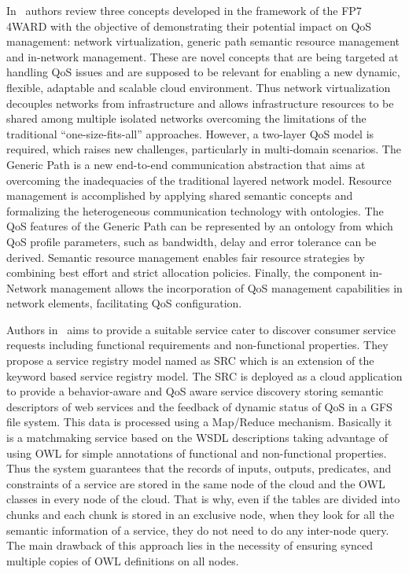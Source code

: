 In~\cite{5682131} authors review three concepts developed in the framework of 
the FP7 4WARD with the objective of demonstrating their potential impact on QoS 
management: network virtualization, generic path semantic resource management 
and in-network management. These are novel concepts that are being targeted at 
handling QoS issues and are supposed to be relevant for enabling a new dynamic, 
flexible, adaptable and scalable cloud environment. Thus network virtualization 
decouples networks from infrastructure and allows infrastructure resources to be 
shared among multiple isolated networks overcoming the limitations of the 
traditional “one-size-fits-all” approaches. However, a two-layer QoS model is 
required, which raises new challenges, particularly in multi-domain scenarios. 
The Generic Path is a new end-to-end communication abstraction that aims at 
overcoming the inadequacies of the traditional layered network model. Resource 
management is accomplished by applying shared semantic concepts and formalizing 
the heterogeneous communication technology with ontologies. The QoS features of 
the Generic Path can be represented by an ontology from which QoS profile 
parameters, such as bandwidth, delay and error tolerance can be derived. 
Semantic resource management enables fair resource strategies by combining best 
effort and strict allocation policies. Finally, the component in-Network 
management allows the incorporation of QoS management capabilities in network 
elements, facilitating QoS configuration.

Authors in~\cite{DBLP:conf/soca/ChenL10} aims to provide a suitable service cater to discover consumer 
service requests including functional requirements and non-functional 
properties. They propose a service registry model named as SRC which is an 
extension of the keyword based service registry model. The SRC is deployed as a 
cloud application to provide a behavior-aware and QoS aware service discovery 
storing semantic descriptors of web services and the feedback of dynamic status 
of QoS in a GFS file system. This data is processed using a Map/Reduce 
mechanism. Basically it is a matchmaking service based on the WSDL descriptions 
taking advantage of using OWL for simple annotations of functional and 
non-functional properties. Thus the system guarantees that the records of 
inputs, outputs, predicates, and constraints of a service are stored in the same 
node of the cloud and the OWL classes in every node of the cloud. That is why, 
even if the tables are divided into chunks and each chunk is stored in an 
exclusive node, when they look for all the semantic information of a service, 
they do not need to do any inter-node query. The main drawback of this approach 
lies in the necessity of ensuring synced multiple copies of OWL definitions on 
all nodes.

